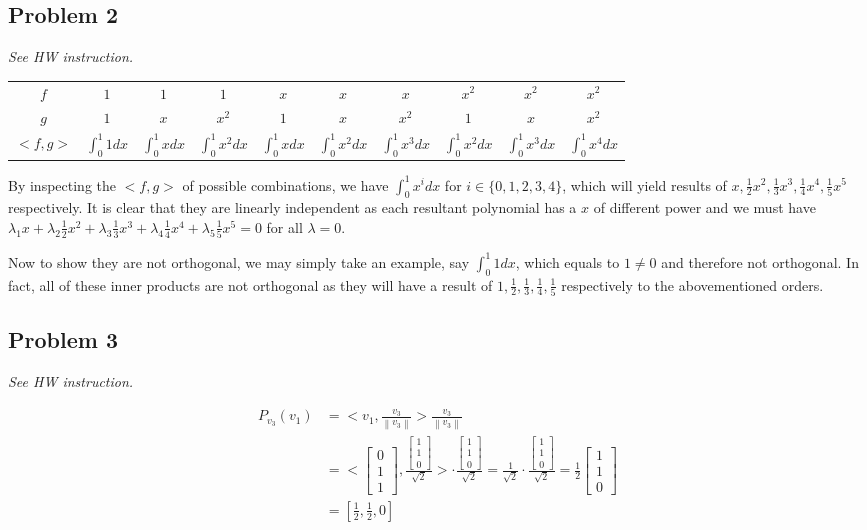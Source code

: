 \documentclass[11pt]{article}
\providecommand{\qbm}[1]{\begin{bmatrix} #1 \end{bmatrix}}
\providecommand{\norm}[1]{\left\lVert #1 \right\rVert}
\begin{document}
\subsection*{Problem 2}
\textit{See HW instruction.}\newline


\begin{table}
    \centering
    \begin{tabular}{ c | c c c c c c c c c}
        \hline
        $f$ & $1$ & $1$ & $1$ & $x$ & $x$ & $x$ & $x^2$ & $x^2$ & $x^2$ \\
        $g$ & $1$ & $x$ & $x^2$ & $1$ & $x$ & $x^2$ & $1$ & $x$ & $x^2$ \\
        \hline
        $<f, g>$ & $\int_{0}^{1} 1 dx$ & $\int_{0}^{1} x dx$ & $\int_{0}^{1} x^2 dx$ & $\int_{0}^{1} x dx$ & $\int_{0}^{1} x^2 dx$ & $\int_{0}^{1} x^3 dx$ & $\int_{0}^{1} x^2 dx$  & $\int_{0}^{1} x^3 dx$ & $\int_{0}^{1} x^4 dx$
    \end{tabular}
\end{table}

By inspecting the $<f, g>$ of possible combinations, we have $\int_{0}^{1} x^i dx$ for $i \in \{0, 1, 2, 3, 4\}$, which will yield results of $x, \frac{1}{2}x^2, \frac{1}{3}x^3, \frac{1}{4}x^4, \frac{1}{5}x^5$ respectively. It is clear that they are linearly independent as each resultant polynomial has a $x$ of different power and we must have $\lambda_{1}x + \lambda_{2}\frac{1}{2}x^2 + \lambda_{3}\frac{1}{3}x^3 + \lambda_{4}\frac{1}{4}x^4 + \lambda_{5}\frac{1}{5}x^5 = 0$ for all $\lambda = 0$.

Now to show they are not orthogonal, we may simply take an example, say $\int_{0}^{1} 1 dx$, which equals to $1 \neq 0$ and therefore not orthogonal. In fact, all of these inner products are not orthogonal as they will have a result of $1, \frac{1}{2}, \frac{1}{3}, \frac{1}{4}, \frac{1}{5}$ respectively to the abovementioned orders.

\subsection*{Problem 3}
\textit{See HW instruction.}\newline


\begin{align*}
    P_{v_3}(v_1) &= < v_1, \frac{v_3}{\norm{v_3}} > \frac{v_3}{\norm{v_3}} \\
    &= < \qbm{0 \\ 1 \\ 1}, \frac{\qbm{1 \\ 1 \\ 0}}{\sqrt{2}} > \cdot \frac{\qbm{1 \\ 1 \\ 0}}{\sqrt{2}} = \frac{1}{\sqrt{2}} \cdot \frac{\qbm{1 \\ 1 \\ 0}}{\sqrt{2}} = \frac{1}{2} \qbm{1 \\ 1 \\ 0} \\
    &= [\frac{1}{2}, \frac{1}{2}, 0]
\end{align*}
\end{document}

